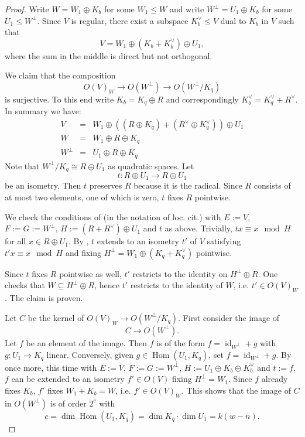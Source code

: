 \documentclass[a4paper]{amsart}
\theoremstyle{definition}
\theoremstyle{plain}
\DeclareMathOperator{\id}{id}
\DeclareMathOperator{\Hom}{Hom}
\begin{document}
\begin{proof}
Write $W = W_1 \oplus K_b$ for some $W_1 \leq W$ and write $W^\perp = U_1 \oplus K_b$ for some $U_1 \leq W^\perp$. 
Since $V$ is regular, there exist a subspace $K_b^\vee \leq V$ dual to $K_b$ in $V$ such that 
\[V = W_1 \oplus (K_b + K_b^\vee)\oplus U_1,\]
where the sum in the middle is direct but not orthogonal.

We claim that the composition
\[O(V)_W \to O(W^\perp) \to O(W^\perp/K_q)\] is surjective. 
To this end write $K_b = K_q \oplus R$ and correspondingly $K_b^\vee = K_q^\vee + R^\vee$. 
In summary we have:
\begin{eqnarray}
V &=& W_1 \oplus \left((R \oplus K_q)+(R^\vee \oplus K_q^\vee)\right) \oplus U_1\\
W &=& W_1 \oplus R \oplus K_q\\
W^\perp &=& U_1 \oplus R \oplus K_q
\end{eqnarray}
Note that $W^\perp / K_q\cong R \oplus U_1$ as quadratic spaces. 
Let 
\[t: R \oplus U_1 \to R \oplus U_1\] 
be an isometry.
Then $t$ preserves $R$ because it is the radical. Since $R$ consists of at most two elements, one of which is zero, $t$ fixes $R$ pointwise. 

We check the conditions of \cite[Satz 4.3]{kneser} (in the notation of loc. cit.) with $E:=V$, $F:=G:=W^\perp$, $H:= (R +R^\vee)\oplus U_1$ and $t$ as above.
Trivially, $tx \equiv x \mod H$ for all $x \in R \oplus U_1$. By \cite[Satz 4.3]{kneser}, $t$ extends to an isometry $t'$ of $V$ satisfying $t'x \equiv x \mod H$ and fixing $H^\perp=W_1 \oplus (K_q+K_q^\vee)$ pointwise. 

Since $t$ fixes $R$ pointwise as well, $t'$ restricts to the identity on $H^\perp \oplus R$. One checks that $W \subseteq H^\perp \oplus R$, hence $t'$ restricts to the identity of $W$, i.e. $t' \in O(V)_W$.
The claim is proven.

Let $C$ be the kernel of $O(V)_W \to O(W^\perp/K_q)$. 
First consider the image of 
\begin{equation}\label{eq:CtoOWperp}
C \to O(W^\perp).
\end{equation}
Let $f$ be an element of the image. Then $f$ is of the form 
$f = \id_{W^\perp} + g$ with $g\colon U_1 \to K_q$ linear.
Conversely, given $g \in \Hom(U_1, K_q)$,
set $f = \id_{W^\perp}+g$. By \cite[Satz 4.3]{kneser} once more, this time with $E:=V$, $F:=G:=W^\perp$, $H:=U_1 \oplus K_b \oplus K_b^\vee$ and $t:=f$, $f$ can be extended to an isometry $f' \in O(V)$ 
fixing $H^\perp=W_1$. Since $f$ already fixes $K_b$, $f'$ fixes $W_1+K_b=W$, i.e. $f' \in O(V)_W$.
This shows that the image of $C$ in $O(W^\perp)$ is of order $2^c$ with 
\[c = \dim \Hom(U_1,K_q)=\dim K_q \cdot \dim U_1=k(w-n).\]


\end{proof}
\end{document}

